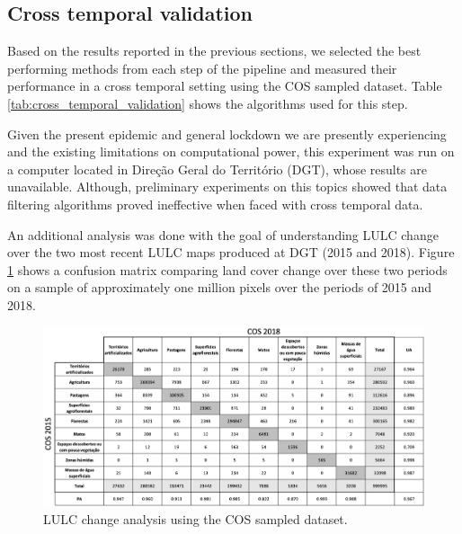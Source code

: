 \documentclass[12pt, english, openany]{book}
\begin{document}
\subsection*{Cross temporal validation}
Based on the results reported in the previous sections, we selected the best
performing methods from each step of the pipeline and measured their
performance in a cross temporal setting using the COS sampled dataset. Table
\ref{tab:cross_temporal_validation} shows the algorithms used for this step.


Given the present epidemic and general lockdown we are presently experiencing
and the existing limitations on computational power, this experiment was run on
a computer located in Direção Geral do Território (DGT), whose results are
unavailable. Although, preliminary experiments on this topics showed that data
filtering algorithms proved ineffective when faced with cross temporal data.

An additional analysis was done with the goal of understanding LULC change over
the two most recent LULC maps produced at DGT (2015 and 2018). Figure
\ref{fig:lulc_change_analysis} shows a confusion matrix comparing land cover change
over these two periods on a sample of approximately one million pixels over the
periods of 2015 and 2018.

\begin{figure}[H]
  \centering
  \includegraphics[width=1\linewidth]{lulc_change_analysis.png}
  \caption[Generated maps per classifier.]{LULC change analysis using the COS sampled dataset.}
  \label{fig:lulc_change_analysis}
\end{figure}



\end{document}
